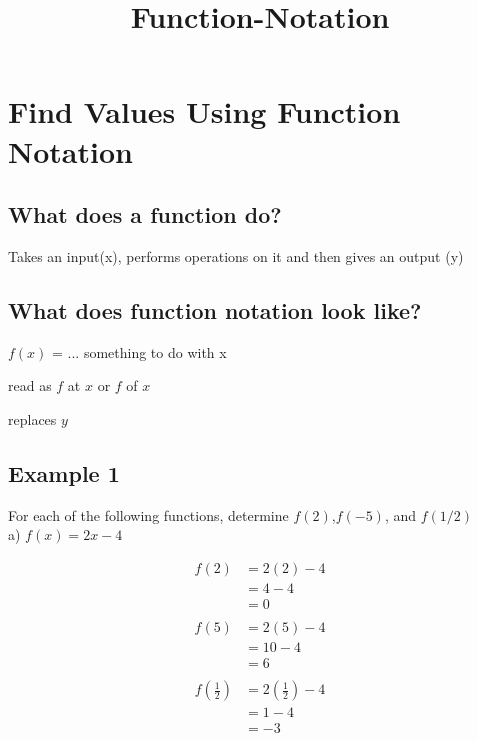 \documentclass{article}
\begin{document}
\title{Function-Notation}

\section*{Find Values Using Function Notation}

\subsection*{What does a function do?}
Takes an input(x), performs operations on it and then gives an output (y)

\subsection*{What does function notation look like?}
$f(x)$ = ... something to do with x

read as $f$ at $x$ or $f$ of $x$

replaces $y$

\subsection*{Example 1}
For each of the following functions, determine $f(2)$,$f(-5)$, and $f(1/2)$\\
\indent
a) $f(x) = 2x - 4$

\begin{multicols}{3}
\noindent
\begin{equation*}
\begin{split}
    f(2) &= 2(2) - 4\\
    &= 4 - 4\\
    &= 0\\
\end{split}
\end{equation*}
\begin{equation*}
\begin{split}
    f(5) &= 2(5) - 4\\
    &= 10 - 4\\
    &= 6\\
\end{split}
\end{equation*}
\begin{equation*}
\begin{split}
    f\left(\frac{1}{2}\right) &= 2\left(\frac{1}{2}\right) - 4\\
    &= 1 - 4\\
    &= -3\\
\end{split}
\end{equation*}
\end{multicols}
\end{document}
